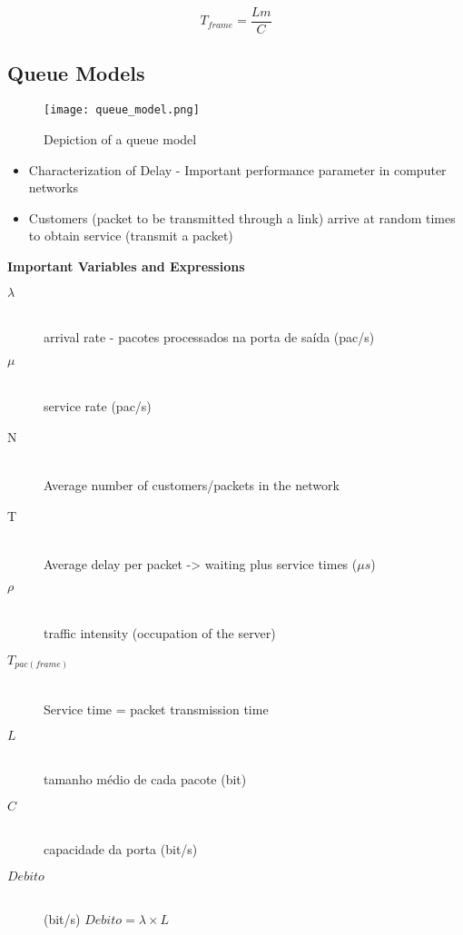 \documentclass[../resumosRCOM.tex]{subfiles}
\begin{document}
\begin{equation}
    T_{frame} = \frac{Lm}{C}
\end{equation}

\subsection{Queue Models}

\begin{figure}[H]
    \centering
    \texttt{[image: queue\_model.png]}
    \caption{Depiction of a queue model}
\end{figure}

\begin{itemize}
    \item Characterization of Delay - Important performance parameter in computer networks
    \item Customers (packet to be transmitted through a link) arrive at random times to obtain service (transmit a packet) 
\end{itemize}

\textbf{Important Variables and Expressions}
\begin{description}
    \item[\(\lambda\)] \hfill \\ arrival rate - pacotes processados na porta de saída (pac/s)
    \item[\(\mu\)] \hfill \\ service rate (pac/s)
    \item[N] \hfill \\ Average number of customers/packets in the network
    \item[T] \hfill \\ Average delay per packet -> waiting plus service times ($\mu s$)
    \item[\(\rho\)] \hfill \\ traffic intensity (occupation of the server)
    \item[\(T_{pac(frame)}\)] \hfill \\ Service time = packet transmission time
    \item[\(L\)] \hfill \\ tamanho médio de cada pacote (bit)
    \item[\(C\)] \hfill \\ capacidade da porta (bit/s)
    \item[\(Debito\)] \hfill \\ (bit/s) $Debito=\lambda\times L$
    
\end{description}
\end{document}
